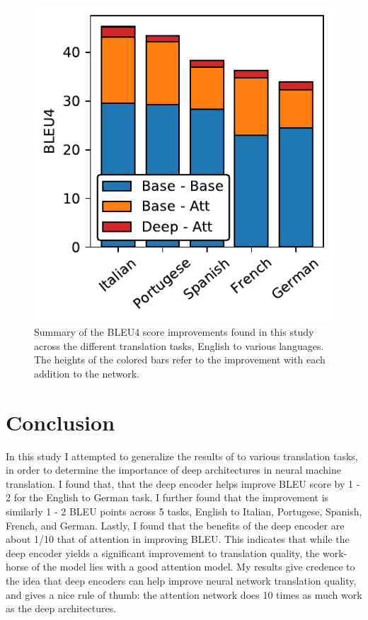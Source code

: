 \documentclass[twocolumn,superscriptaddress]{revtex4-1}
\begin{document}
\begin{figure}
\includegraphics{../plots/barplot.pdf}
\caption{
Summary of the BLEU4 score improvements found in this study across the different translation tasks, English to various languages.
The heights of the colored bars refer to the improvement with each addition to the network.
}
\label{fig:barplot}
\end{figure}

\section{Conclusion}
In this study I attempted to generalize the results of \cite{miceli-barone-etal-2017-deep} to various translation tasks, in order to determine the importance of deep architectures in neural machine translation.
I found that, that the deep encoder helps improve BLEU score by 1 - 2 for the English to German task.
I further found that the improvement is similarly 1 - 2 BLEU points across 5 tasks, English to Italian, Portugese, Spanish, French, and German.
Lastly, I found that the benefits of the deep encoder are about 1/10 that of attention in improving BLEU.
This indicates that while the deep encoder yields a significant improvement to translation quality, the work-horse of the model lies with a good attention model.
My results give credence to the idea that deep encoders can help improve neural network translation quality, and gives a nice rule of thumb: the attention network does 10 times as much work as the deep architectures.


\end{document}
